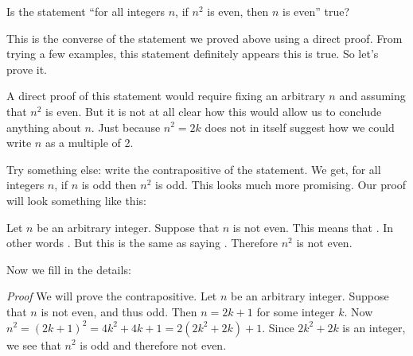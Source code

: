 \documentclass[11pt,]{book}
\makeatletter
\theoremstyle{ptxplainnotitle}
\theoremstyle{ptxplaintitle}
\renewcommand*{\proofname}{Proof}
\renewenvironment{proof}[1][\proofname]{\par
  \pushQED{\qed}%
  \normalfont \topsep6\p@\@plus6\p@\relax
  \trivlist
  \item\relax
    {\itshape
    #1\@addpunct{.}}\hspace\labelsep\ignorespaces
}{%
  \popQED\endtrivlist\@endpefalse
}
\theoremstyle{ptxdefinitionnotitle}
\theoremstyle{ptxdefinitiontitle}
\theoremstyle{ptxdefinitionnotitle}
\theoremstyle{ptxdefinitiontitle}
\theoremstyle{ptxdefinitionnotitle}
\theoremstyle{ptxdefinitiontitle}
\theoremstyle{ptxdefinitiontitlenonumber}
\theoremstyle{ptxdefinitiontitlenonumber}
\numberwithin{equation}{chapter}
\makeatother
\begin{document}
\begin{example}\label{example-65}
\hypertarget{p-2317}{}%
Is the statement ``for all integers \(n\), if \(n^2\) is even, then \(n\) is even'' true?%
\par\smallskip%
\noindent\textbf{}\hypertarget{solution-252}{}\hypertarget{p-2318}{}%
This is the converse of the statement we proved above using a direct proof. From trying a few examples, this statement definitely appears this is true. So let's prove it.%
\par
\hypertarget{p-2319}{}%
A direct proof of this statement would require fixing an arbitrary \(n\) and assuming that \(n^2\) is even. But it is not at all clear how this would allow us to conclude anything about \(n\). Just because \(n^2 = 2k\) does not in itself suggest how we could write \(n\) as a multiple of 2.%
\par
\hypertarget{p-2320}{}%
Try something else: write the contrapositive of the statement. We get, for all integers \(n\), if \(n\) is odd then \(n^2\) is odd. This looks much more promising. Our proof will look something like this:%
\par
\hypertarget{p-2321}{}%
Let \(n\) be an arbitrary integer. Suppose that \(n\) is not even. This means that \textellipsis{}. In other words \textellipsis{}. But this is the same as saying \textellipsis{}. Therefore \(n^2\) is not even.%
\par
\hypertarget{p-2322}{}%
Now we fill in the details:%
\begin{proof}\hypertarget{proof-24}{}
\hypertarget{p-2323}{}%
We will prove the contrapositive. Let \(n\) be an arbitrary integer. Suppose that \(n\) is not even, and thus odd. Then \(n= 2k+1\) for some integer \(k\). Now \(n^2 = (2k+1)^2 = 4k^2 + 4k + 1 = 2(2k^2 + 2k) + 1\). Since \(2k^2 + 2k\) is an integer, we see that \(n^2\) is odd and therefore not even.%
\end{proof}
\end{example}
\end{document}

